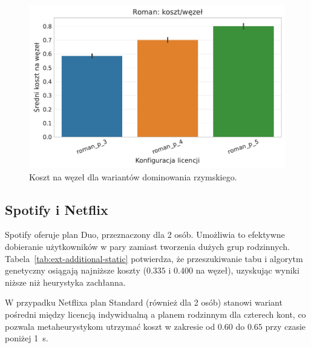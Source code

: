 \begin{figure}[H]
    \centering
    \includegraphics[width=0.6\linewidth]{assets/figures/extensions/static/roman_cost_per_node_comparison.pdf}
    \caption{Koszt na węzeł dla wariantów dominowania rzymskiego.}
    \label{fig:ext-roman-cost}
\end{figure}

\subsection{Spotify i Netflix}

Spotify oferuje plan Duo, przeznaczony dla 2 osób. Umożliwia to efektywne dobieranie użytkowników w pary zamiast tworzenia dużych grup rodzinnych. Tabela~\ref{tab:ext-additional-static} potwierdza, że przeszukiwanie tabu i algorytm genetyczny osiągają najniższe koszty ($0.335$ i $0.400$ na węzeł), uzyskując wyniki niższe niż heurystyka zachłanna.

W przypadku Netflixa plan Standard (również dla 2 osób) stanowi wariant pośredni między licencją indywidualną a planem rodzinnym dla czterech kont, co pozwala metaheurystykom utrzymać koszt w zakresie od $0.60$ do $0.65$ przy czasie poniżej \SI{1}{\second}.

